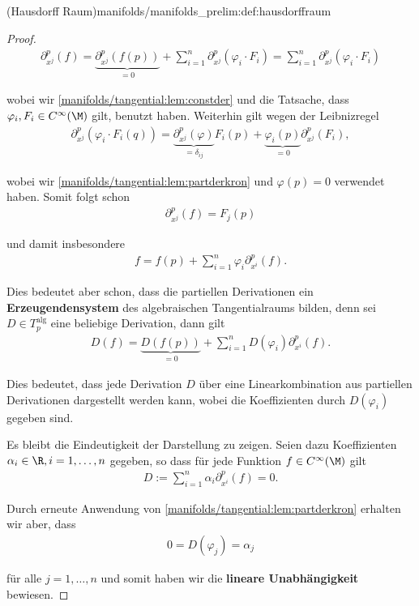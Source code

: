 \documentclass[letterpaper,10pt,english]{jupyterBook}
\begin{document}
\begin{definition}{(Hausdorff Raum)}{manifolds/manifolds_prelim:def:hausdorffraum}
\begin{proof}
\begin{align*}
\partial_{x^j}^p (f) = 
\underbrace{\partial_{x^j}^p (f(p))}_{=0} + 
\sum_{i=1}^{n} \partial_{x^j}^p(\varphi_i \cdot F_i) = 
\sum_{i=1}^{n} \partial_{x^j}^p(\varphi_i \cdot F_i)
\end{align*}
\par
wobei wir \cref{manifolds/tangential:lem:constder} und die Tatsache, dass \(\varphi_i, F_i\in C^\infty(\M)\) gilt, benutzt haben.
Weiterhin gilt wegen der Leibnizregel
\begin{align*}
\partial_{x^j}^p(\varphi_i \cdot F_i(q)) = 
\underbrace{\partial_{x^j}^p(\varphi)}_{=\delta_{ij}} F_i(p)+ \underbrace{\varphi_i(p)}_{=0} \partial_{x^j}^p(F_i),
\end{align*}
\par
wobei wir \cref{manifolds/tangential:lem:partderkron} und \(\varphi(p)=0\) verwendet haben.
Somit folgt schon
\begin{align*}
\partial_{x^j}^p (f) = F_j(p)
\end{align*}
\par
und damit insbesondere
\begin{align*}
f = f(p) + \sum_{i=1}^{n} \varphi_i \partial_{x^i}^p(f).
\end{align*}
\par
Dies bedeutet aber schon, dass die partiellen Derivationen ein \textbf{Erzeugendensystem} des algebraischen Tangentialraums bilden, denn sei \(D\in T^{\text{alg}}_p\) eine beliebige Derivation, dann gilt
\begin{align*}
D(f) = \underbrace{D(f(p))}_{=0} + \sum_{i=1}^n D(\varphi_i) \partial_{x^i}^p(f).
\end{align*}
\par
Dies bedeutet, dass jede Derivation \(D\) über eine Linearkombination aus partiellen Derivationen dargestellt werden kann, wobei die Koeffizienten durch \(D(\varphi_i)\) gegeben sind.

\par
Es bleibt die Eindeutigkeit der Darstellung zu zeigen.
Seien dazu Koeffizienten \(\alpha_i \in \R, i=1,\ldots,n\) gegeben, so dass für jede Funktion \(f\in C^\infty(\M)\) gilt
\begin{align*}
D:= \sum_{i=1}^n \alpha_i \partial_{x^i}^p(f) = 0.
\end{align*}
\par
Durch erneute Anwendung von \cref{manifolds/tangential:lem:partderkron} erhalten wir aber, dass
\begin{align*}
0 = D(\varphi_j) = \alpha_j\end{align*}
\par
für alle \(j=1,\ldots,n\) und somit haben wir die \textbf{lineare Unabhängigkeit} bewiesen.


\end{proof}
\end{definition}
\end{document}
